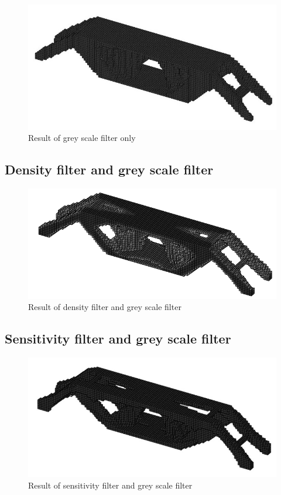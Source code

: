 \documentclass{article}
\begin{document}
\begin{figure}[!htb]
\centering
\includegraphics[width=1\textwidth]{Greyscalefilteronly}
\caption{Result of grey scale filter only}
\end{figure}
\FloatBarrier

\subsection{Density filter and grey scale filter}

\begin{figure}[!htb]
\centering
\includegraphics[width=1\textwidth]{Densityfilterandgreyscalefilter}
\caption{Result of density filter and grey scale filter}
\end{figure}
\FloatBarrier

\subsection{Sensitivity filter and grey scale filter}

\begin{figure}[!htb]
\centering
\includegraphics[width=1\textwidth]{Sensitivityfilterandgreyscalefilter}
\caption{Result of sensitivity filter and grey scale filter}
\end{figure}
\FloatBarrier
\end{document}
